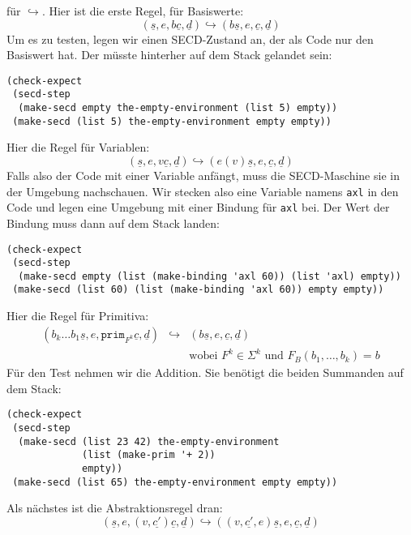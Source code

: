 für $\hookrightarrow$.  Hier ist die erste Regel, für Basiswerte:
%
\begin{displaymath}
  (\underline{s}, e, b\underline{c}, \underline{d})
  \hookrightarrow
  (b\underline{s}, e, \underline{c}, \underline{d})
\end{displaymath}
%
Um es zu testen, legen wir einen SECD-Zustand an, der als Code nur den
Basiswert hat.  Der müsste hinterher auf dem Stack gelandet sein:
%
\begin{lstlisting}
(check-expect
 (secd-step
  (make-secd empty the-empty-environment (list 5) empty))
 (make-secd (list 5) the-empty-environment empty empty))
\end{lstlisting}
%
Hier die Regel für Variablen:
%
\begin{displaymath}
  (\underline{s}, e, v\underline{c}, \underline{d})
  \hookrightarrow
  (e(v)\underline{s}, e, \underline{c}, \underline{d})
\end{displaymath}
%
Falls also der Code mit einer Variable anfängt, muss die SECD-Maschine
sie in der Umgebung nachschauen.  Wir stecken also eine Variable
namens \lstinline{axl} in den Code und legen eine Umgebung mit einer
Bindung für \lstinline{axl} bei.  Der Wert der Bindung muss dann auf
dem Stack landen:
%
\begin{lstlisting}
(check-expect
 (secd-step
  (make-secd empty (list (make-binding 'axl 60)) (list 'axl) empty))
 (make-secd (list 60) (list (make-binding 'axl 60)) empty empty))
\end{lstlisting}
%
Hier die Regel für Primitiva:
%
\begin{eqnarray*}
  (b_k\ldots b_1 \underline{s}, e, \mathtt{prim}_{F^k}\underline{c}, \underline{d})
  &\hookrightarrow&
  (b\underline{s}, e, \underline{c}, \underline{d})
  \\ && \textrm{wobei $F^k\in\Sigma^k$ und $F_B(b_1,\ldots,b_k) = b$}
\end{eqnarray*}
%
Für den Test nehmen wir die Addition.  Sie benötigt die beiden Summanden auf dem Stack:
%
\begin{lstlisting}
(check-expect
 (secd-step
  (make-secd (list 23 42) the-empty-environment
             (list (make-prim '+ 2))
             empty))
 (make-secd (list 65) the-empty-environment empty empty))
\end{lstlisting}
%
Als nächstes ist die Abstraktionsregel dran:
%
\begin{displaymath}
  (\underline{s}, e, (v, \underline{c'}) \underline{c}, \underline{d})
  \hookrightarrow
  ((v, \underline{c'}, e) \underline{s}, e, \underline{c}, \underline{d})
\end{displaymath}
